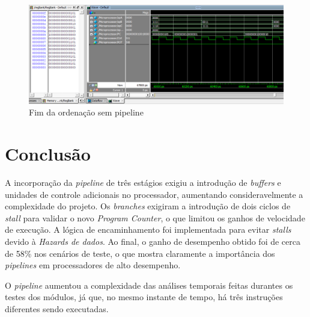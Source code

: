\documentclass[11pt,a4paper,titlepage]{article}
\begin{document}
\begin{figure}[!h]
\centering
\includegraphics[scale=0.5]{images/ordenasp2.png}
\caption{Fim da ordenação sem pipeline}
\label{fig:ordenasp2}
\end{figure}

\section{Conclusão}

A incorporação da \textit{pipeline} de três estágios exigiu a introdução de \textit{buffers} e unidades de controle adicionais no processador, aumentando consideravelmente a complexidade do projeto. Os \textit{branches} exigiram a introdução de dois ciclos de \textit{stall} para validar o novo \textit{Program Counter}, o que limitou os ganhos de velocidade de execução. A lógica de encaminhamento foi implementada para evitar \textit{stalls} devido à \textit{Hazards de dados}. Ao final, o ganho de desempenho obtido foi de cerca de 58\% nos cenários de teste, o que mostra claramente a importância dos \textit{pipelines} em processadores de alto desempenho.

O \textit{pipeline} aumentou a complexidade das análises temporais feitas durantes os testes dos módulos, já que, no mesmo instante de tempo, há três instruções diferentes sendo executadas.


%

\nocite{*}
\end{document}
